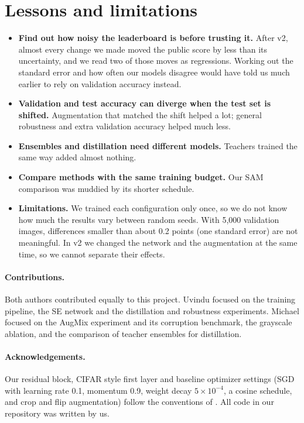 \documentclass{article}
\begin{document}
\section{Lessons and limitations}
\begin{itemize}
  \item \textbf{Find out how noisy the leaderboard is before trusting it.} After v2, almost every change we made moved the
  public score by less than its uncertainty, and we read two of those moves as regressions. Working out the standard error
  and how often our models disagree would have told us much earlier to rely on validation accuracy instead.
  \item \textbf{Validation and test accuracy can diverge when the test set is shifted.} Augmentation that matched the
  shift helped a lot; general robustness and extra validation accuracy helped much less.
  \item \textbf{Ensembles and distillation need different models.} Teachers trained the same way added almost nothing.
  \item \textbf{Compare methods with the same training budget.} Our SAM comparison was muddied by its shorter schedule.
  \item \textbf{Limitations.} We trained each configuration only once, so we do not know how much the results vary
  between random seeds. With 5,000 validation images, differences smaller than about 0.2 points (one standard error) are
  not meaningful. In v2 we changed the network and the augmentation at the same time, so we cannot separate their effects.
\end{itemize}

\paragraph{Contributions.} Both authors contributed equally to this project. Uvindu focused on the training pipeline, the
SE network and the distillation and robustness experiments. Michael focused on the AugMix experiment and its corruption
benchmark, the grayscale ablation, and the comparison of teacher ensembles for distillation.

\paragraph{Acknowledgements.} Our residual block, CIFAR style first layer and baseline optimizer settings (SGD with learning
rate 0.1, momentum 0.9, weight decay $5\times10^{-4}$, a cosine schedule, and crop and flip augmentation) follow the
conventions of \citet{kuangliu2017pytorchcifar}. All code in our repository was written by us.



\end{document}
